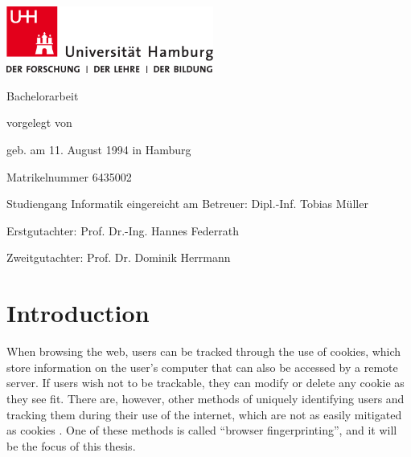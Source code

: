 \documentclass[
    fontsize=12pt,
    headings=small,
    parskip=half,
    bibliography=totoc,
    numbers=noenddot,
    open=any
    ]{scrreprt}
\begin{document}
\newpage
\thispagestyle{empty}
\begin{titlepage}%
\includegraphics[width=6.8cm]{images/up-uhh-logo-u-2010-u-farbe-u-rgb.pdf}
\begin{center}\Large
	\vfill
	Bachelorarbeit
	\vfill
	\makeatletter
	{\Large\textsf{\textbf{\@title}}\par}
	\makeatother
	\vfill
	vorgelegt von
	\par\bigskip
	\makeatletter
	{\@author} \par
	\makeatother
	geb. am 11. August 1994 in Hamburg \par
	Matrikelnummer 6435002 \par
	Studiengang Informatik
	\vfill
	\makeatletter
	eingereicht am {\@date}
	\makeatother
	\vfill
	Betreuer: Dipl.-Inf. Tobias Müller \par
	Erstgutachter: Prof. Dr.-Ing. Hannes Federrath \par
	Zweitgutachter: Prof. Dr. Dominik Herrmann
\end{center}
\end{titlepage}%


\setcounter{tocdepth}{1}
\tableofcontents

\chapter{Introduction}
\label{chap:introduction}

When browsing the web, users can be tracked through the use of cookies, which store information on the user's computer
that can also be accessed by a remote server.
If users wish not to be trackable, they can modify or delete any cookie as they see fit.
There are, however, other methods of uniquely identifying users and tracking them during their use of the internet,
which are not as easily mitigated as cookies \cite{am_i_unique}. One of these methods is called ``browser fingerprinting'',
and it will be the focus of this thesis.
\end{document}
